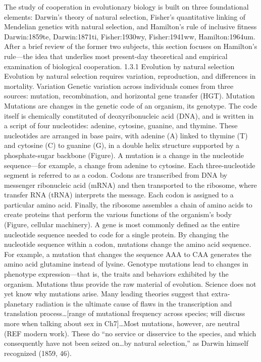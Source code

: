 \documentclass{tufte-book} %
\begin{document}
The study of cooperation in evolutionary biology is built on three foundational elements: Darwin’s theory of natural selection, Fisher’s quantitative linking of Mendelian genetics with natural selection, and Hamilton’s rule of inclusive fitness {Darwin:1859te, Darwin:1871ti, Fisher:1930wy, Fisher:1941ww, Hamilton:1964um}. After a brief review of the former two subjects, this section focuses on Hamilton’s rule—the idea that underlies most present-day theoretical and empirical examination of biological cooperation. 
	1.3.1	Evolution by natural selection
Evolution by natural selection requires variation, reproduction, and differences in mortality.
Variation
Genetic variation across individuals comes from three sources: mutation, recombination, and horizontal gene transfer (HGT).
Mutation
Mutations are changes in the genetic code of an organism, its genotype. The code itself is chemically constituted of deoxyribonucleic acid (DNA), and is written in a script of four nucleotides: adenine, cytosine, guanine, and thymine. These nucleotides are arranged in base pairs, with adenine (A) linked to thymine (T) and cytosine (C) to guanine (G), in a double helix structure supported by a phosphate-sugar backbone (Figure). A mutation is a change in the nucleotide sequence—for example, a change from adenine to cytosine. Each three-nucleotide segment is referred to as a codon. Codons are transcribed from DNA by messenger ribonucleic acid (mRNA) and then transported to the ribosome, where transfer RNA (tRNA) interprets the message. Each codon is assigned to a particular amino acid.  Finally, the ribosome assembles a chain of amino acids to create proteins that perform the various functions of the organism’s body (Figure, cellular machinery). A gene is most commonly defined as the entire nucleotide sequence needed to code for a single protein. By changing the nucleotide sequence within a codon, mutations change the amino acid sequence. For example, a mutation that changes the sequence AAA to CAA generates the amino acid glutamine instead of lysine. Genotype mutations lead to changes in phenotype expression—that is, the traits and behaviors exhibited by the organism. 
Mutations thus provide the raw material of evolution. Science does not yet know why mutations arise. Many leading theories suggest that extra-planetary radiation is the ultimate cause of flaws in the transcription and translation process…[range of mutational frequency across species; will discuss more when talking about sex in Ch7]…Most mutations, however, are neutral (REF modern work). These do “no service or disservice to the species, and which consequently have not been seized on…by natural selection,” as Darwin himself recognized (1859, 46). 
\end{document}
